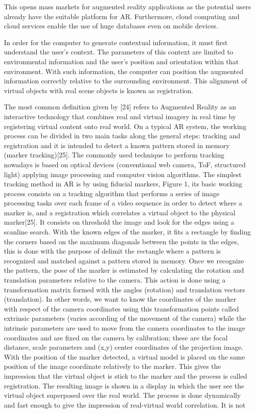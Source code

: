 This opens mass markets for augmented reality applications as the potential users already have the suitable platform for AR. Furthermore, cloud computing and cloud services enable the use of huge databases even on mobile devices.  



In order for the computer to generate contextual information, it must first understand the user’s context. The parameters of this context are limited to environmental information and the user’s position and orientation within that environment. With such information, the computer can position the augmented information correctly relative to the surrounding environment. This alignment of virtual objects with real scene objects is known as registration. 


The most common definition given by [24] refers to Augmented Reality as an interactive technology that combines real and virtual imagery in real time by registering virtual content onto real world. On a typical AR system, the working process can be divided in two main tasks along the general steps: tracking and registration and it is intended to detect a known pattern stored in memory (marker tracking)[25]. The commonly used technique to perform tracking nowadays is based on optical devices (conventional web camera, ToF, structured light) applying image processing and computer vision algorithms. The simplest tracking method in AR is by using fiducial markers, Figure 1, its basic working process consists on a tracking algorithm that performs a series of image processing tasks over each frame of a video sequence in order to detect where a marker is, and a registration which correlates a virtual object to the physical marker[25]. It consists on threshold the image and look for the edges using a scanline search. With the known edges of the marker, it fits a rectangle by finding the corners based on the maximum diagonals between the points in the edges, this is done with the purpose of delimit the rectangle where a pattern is recognized and matched against a pattern stored in memory. Once we recognize the pattern, the pose of the marker is estimated by calculating the rotation and translation parameters relative to the camera. This action is done using a transformation matrix formed with the angles (rotation) and translation vectors (translation). In other words, we want to know the coordinates of the marker with respect of the camera coordinates using this transformation points called extrinsic parameters (varies according of the movement of the camera) while the intrinsic parameters are used to move from the camera coordinates to the image coordinates and are fixed on the camera by calibration; these are the focal distance, scale parameters and (x,y) center coordinates of the projection image. With the position of the marker detected, a virtual model is placed on the same position of the image coordinate relatively to the marker. This gives the impression that the virtual object is stick to the marker and the process is called registration. The resulting image is shown in a display in which the user see the virtual object superposed over the real world. The process is done dynamically and fast enough to give the impression of real-virtual world correlation. It is not 